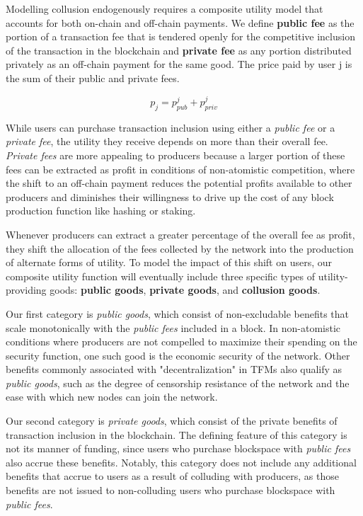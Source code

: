 \documentclass[oneside]{article}   	%
\begin{document}
Modelling collusion endogenously requires a composite utility model that accounts for both on-chain and off-chain payments. We define \textbf{public fee} as the portion of a transaction fee that is tendered openly for the competitive inclusion of the transaction in the blockchain and \textbf{private fee} as any portion distributed privately as an off-chain payment for the same good. The price paid by user j is the sum of their public and private fees.

$$
p_j = p_{pub}^j + p_{priv}^j
$$

While users can purchase transaction inclusion using either a \textit{public fee} or a \textit{private fee}, the utility they receive depends on more than their overall fee. \textit{Private fees} are more appealing to producers because a larger portion of these fees can be extracted as profit in conditions of non-atomistic competition, where the shift to an off-chain payment reduces the potential profits available to other producers and diminishes their willingness to drive up the cost of any block production function like hashing or staking.

Whenever producers can extract a greater percentage of the overall fee as profit, they shift the allocation of the fees collected by the network into the production of alternate forms of utility. To model the impact of this shift on users, our composite utility function will eventually include three specific types of utility-providing goods: \textbf{public goods}, \textbf{private goods}, and \textbf{collusion goods}.

Our first category is \textit{public goods}, which consist of non-excludable benefits that scale monotonically with the \textit{public fees} included in a block. In non-atomistic conditions where producers are not compelled to maximize their spending on the security function, one such good is the economic security of the network. Other benefits commonly associated with "decentralization" in TFMs also qualify as \textit{public goods}, such as the degree of censorship resistance of the network and the ease with which new nodes can join the network.

Our second category is \textit{private goods}, which consist of the private benefits of transaction inclusion in the blockchain. The defining feature of this category is not its manner of funding, since users who purchase blockspace with \textit{public fees} also accrue these benefits. Notably, this category does not include any additional benefits that accrue to users as a result of colluding with producers, as those benefits are not issued to non-colluding users who purchase blockspace with \textit{public fees}.
\end{document}
